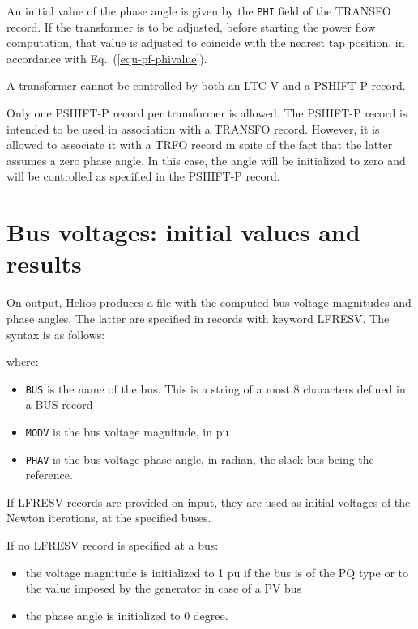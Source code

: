 An initial value of the phase angle is given by the {\tt PHI} field of the TRANSFO record. If the transformer is to be adjusted, before starting the power flow computation, that value is adjusted to coincide with the nearest tap position, in accordance with Eq.~(\ref{equ-pf-phivalue}).

A transformer cannot be controlled by both an LTC-V and a PSHIFT-P record.

Only one PSHIFT-P record per transformer is allowed. The PSHIFT-P record is intended to be used in association with a TRANSFO record. However, it is allowed to associate it with a TRFO record in spite of the fact that the latter assumes a zero phase angle. In this case, the angle will be initialized to zero and will be controlled as specified in the PSHIFT-P record.


\section{Bus voltages: initial values and results}\label{sec-lfresv}

On output, Helios produces a file with the computed bus voltage magnitudes and phase angles. The latter are specified in records with keyword LFRESV. The syntax is as follows:

\hspace*{5ex}{\tt LFRESV BUS MODV PHASV ;}

where:
\begin{itemize}
\item {\tt BUS} is the name of the bus. This is a string of a most 8 characters defined in a BUS record
\item {\tt MODV} is the bus voltage magnitude, in pu
\item {\tt PHAV} is the bus voltage phase angle, in radian, the slack bus being the reference.
\end{itemize}

If LFRESV records are provided on input, they are used as initial voltages of the Newton iterations, at the specified buses. 

If no LFRESV record is specified at a bus:
\begin{itemize}
\item the voltage magnitude is initialized to 1 pu if the bus is of the PQ type or to the value imposed by the generator in case of a PV bus
\item the phase angle is initialized to 0 degree.
\end{itemize}

